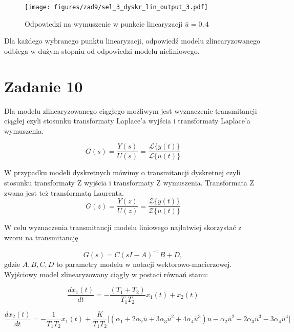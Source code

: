 \documentclass[a4paper,titlepage,11pt,floatssmall]{mwrep}
\begin{document}
\begin{figure}[H]
\centering
\texttt{[image: figures/zad9/sel\_3\_dyskr\_lin\_output\_3.pdf]}
\caption{Odpowiedzi na wymuszenie w punkcie linearyzacji $\bar{u} = 0,4$}
\end{figure}

Dla każdego wybranego punktu linearyzacji, odpowiedź modelu zlinearyzowanego odbiega w dużym stopniu od odpowiedzi modelu nieliniowego.


\section{Zadanie 10}
\indent{} Dla modelu zlinearyzowanego ciągłego możliwym jest wyznaczenie transmitancji ciągłej czyli stosunku transformaty Laplace'a wyjścia i transformaty Laplace'a wymuszenia. 

\begin{equation*}
G(s) = \frac{Y(s)}{U(s)} = \frac{\mathcal{L}\{y(t)\}}{\mathcal{L}\{u(t)\}} 
\end{equation*}

W przypadku modeli dyskretnych mówimy o transmitancji dyskretnej czyli stosunku transformaty Z wyjścia i transformaty Z wymuszenia. Transformata Z zwana jest też transformatą Laurenta.
\begin{equation*}
G(z) = \frac{Y(z)}{U(z)} = \frac{\mathcal{Z}\{y(t)\}}{\mathcal{Z}\{u(t)\}} 
\end{equation*}

W celu wyznaczenia transmitancji modelu liniowego najłatwiej skorzystać z wzoru na transmitancję 

\begin{equation*}
G(s) = C(sI - A)^{-1}  B + D,
\end{equation*}
gdzie $A,B,C,D$ to parametry modelu w notacji wektorowo-macierzowej.
\\
\indent{} Wyjściowy model zlinearyzowany ciągły w postaci równań stanu:

\begin{equation*}
\frac{dx_1(t)}{dt} = -\frac{(T_1 + T_2)}{T_1 T_2} x_1(t) + x_2(t) 
\end{equation*}

\begin{equation*} 
\frac{dx_2(t)}{dt} = -\frac{1}{T_1 T_2}x_1(t) + \frac{K}{T_1 T_2}\bigg[ (\alpha_1 + 2\alpha_2\bar{u} + 3\alpha_3\bar{u}^2 + 4\alpha_4\bar{u}^3)u - \alpha_2\bar{u}^2 - 2\alpha_3\bar{u}^3 - 3\alpha_4\bar{u}^4\bigg] 
\end{equation*}
\end{document}
